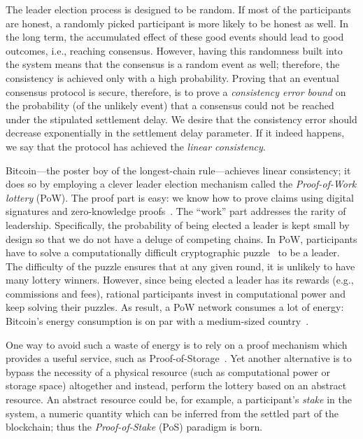 The leader election process is designed to be random. 
If most of the participants are honest, 
a randomly picked participant is more likely to be honest as well. 
In the long term, the accumulated effect of these good events 
should lead to good outcomes, i.e., reaching consensus. 
However, having this randomness built into the system means 
that the consensus is a random event as well; 
therefore, the consistency is achieved only with a high probability. 
Proving that an eventual consensus protocol is secure, 
therefore, is to prove a 
\emph{consistency error bound} 
on the probability (of the unlikely event) that a consensus could not be reached 
under the stipulated settlement delay. 
We desire that the consistency error should decrease exponentially 
in the settlement delay parameter. 
If it indeed happens, 
we say that the protocol has achieved the \emph{linear consistency}.

Bitcoin---the poster boy of the longest-chain rule---achieves 
linear consistency; it does so by employing a clever leader election mechanism 
called the \emph{Proof-of-Work lottery} (PoW). 
The proof part is easy: we know how to prove claims using 
digital signatures and zero-knowledge proofs~\cite{GoldreichFoC}. 
The ``work'' part addresses the rarity of leadership. 
Specifically, 
the probability of being elected a leader is kept small by design 
so that we do not have a deluge of competing chains. 
In PoW, participants have to solve a computationally difficult 
cryptographic puzzle~\cite{Nakamoto2008,GKL,GKL17,Ghost} 
to be a leader. 
The difficulty of the puzzle ensures that at any given round, 
it is unlikely to have many lottery winners. 
However, since being elected a leader has its rewards (e.g., commissions and fees), 
rational participants invest in computational power 
and keep solving their puzzles. 
As result, a PoW network consumes a lot of energy: 
Bitcoin's energy consumption is 
on par with a medium-sized country~\cite{BitcoinEnergy}.

One way to avoid such a waste of energy 
is to rely on a proof mechanism which provides 
a useful service, such as Proof-of-Storage~\cite{ProofOfSpace,Spacemint}. 
Yet another alternative is to bypass the necessity of a physical resource 
(such as computational power or storage space)
altogether and instead, perform the lottery based on an abstract resource. 
An abstract resource could be, for example, 
a participant's \emph{stake} in the system, 
a numeric quantity which can be inferred 
from the settled part of the blockchain; 
thus the \emph{Proof-of-Stake} (PoS) paradigm is born.


